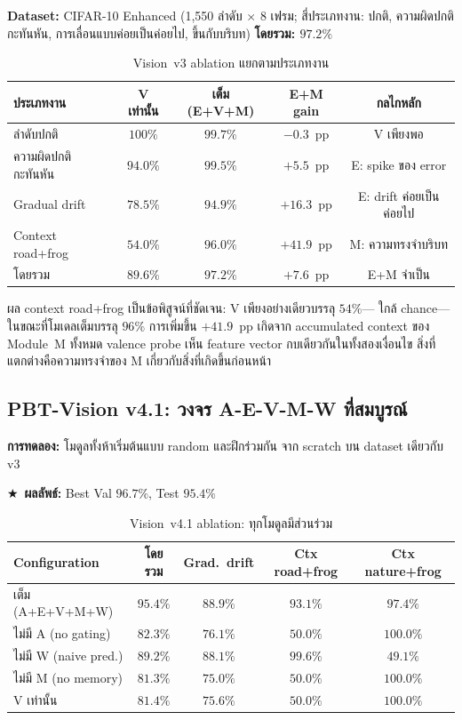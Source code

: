 \documentclass[12pt,a4paper]{article}
\newcommand{\starred}{\textbf{\textcolor{pbtblue}{$\bigstar$}}~}
\begin{document}
\textbf{Dataset:} CIFAR-10 Enhanced (1,550 ลำดับ $\times$ 8 เฟรม;
สี่ประเภทงาน: ปกติ, ความผิดปกติกะทันหัน, การเลื่อนแบบค่อยเป็นค่อยไป, ขึ้นกับบริบท)
\textbf{โดยรวม: $97.2\%$}

\begin{table}[!htbp]
\centering
\caption{Vision~v3 ablation แยกตามประเภทงาน}
\label{tab:v3_ablation}
\small
\begin{tabular}{@{}L{2.8cm}cccc@{}}
\toprule
\textbf{ประเภทงาน} & \textbf{V เท่านั้น} & \textbf{เต็ม (E+V+M)}
  & \textbf{E+M gain} & \textbf{กลไกหลัก} \\
\midrule
ลำดับปกติ   & $100\%$  & $99.7\%$  & $-0.3$~pp   & V เพียงพอ \\
ความผิดปกติกะทันหัน  & $94.0\%$ & $99.5\%$  & $+5.5$~pp   & E: spike ของ error \\
Gradual drift      & $78.5\%$ & $94.9\%$  & $+16.3$~pp  & E: drift ค่อยเป็นค่อยไป \\
Context road+frog  & $54.0\%$ & $96.0\%$  & $\mathbf{+41.9}$~pp & M: ความทรงจำบริบท \\
\midrule
โดยรวม            & $89.6\%$ & $97.2\%$  & $+7.6$~pp   & E+M จำเป็น \\
\bottomrule
\end{tabular}
\end{table}

ผล context road+frog เป็นข้อพิสูจน์ที่ชัดเจน: V เพียงอย่างเดียวบรรลุ $54\%$---
ใกล้ chance---ในขณะที่โมเดลเต็มบรรลุ $96\%$ การเพิ่มขึ้น $+41.9$~pp
เกิดจาก accumulated context ของ Module~M ทั้งหมด
valence probe เห็น feature vector กบเดียวกันในทั้งสองเงื่อนไข
สิ่งที่แตกต่างคือความทรงจำของ M เกี่ยวกับสิ่งที่เกิดขึ้นก่อนหน้า

\subsection{PBT-Vision v4.1: วงจร A-E-V-M-W ที่สมบูรณ์}

\textbf{การทดลอง:} โมดูลทั้งห้าเริ่มต้นแบบ random และฝึกร่วมกัน
จาก scratch บน dataset เดียวกับ v3

\starred\textbf{ผลลัพธ์:} Best Val $96.7\%$, Test $95.4\%$

\begin{table}[!htbp]
\centering
\caption{Vision~v4.1 ablation: ทุกโมดูลมีส่วนร่วม}
\label{tab:v41_ablation}
\small
\begin{tabular}{@{}lcccc@{}}
\toprule
\textbf{Configuration} & \textbf{โดยรวม}
  & \textbf{Grad.\ drift} & \textbf{Ctx road+frog} & \textbf{Ctx nature+frog}\\
\midrule
เต็ม (A+E+V+M+W) & $95.4\%$ & $88.9\%$ & $93.1\%$ & $97.4\%$ \\
ไม่มี A (no gating) & $82.3\%$ & $76.1\%$ & $50.0\%$ & $100.0\%$ \\
ไม่มี W (naive pred.) & $89.2\%$ & $88.1\%$ & $99.6\%$ & $49.1\%$ \\
ไม่มี M (no memory) & $81.3\%$ & $75.0\%$ & $50.0\%$ & $100.0\%$ \\
V เท่านั้น           & $81.4\%$ & $75.6\%$ & $50.0\%$ & $100.0\%$ \\
\bottomrule
\end{tabular}
\end{table}
\end{document}

